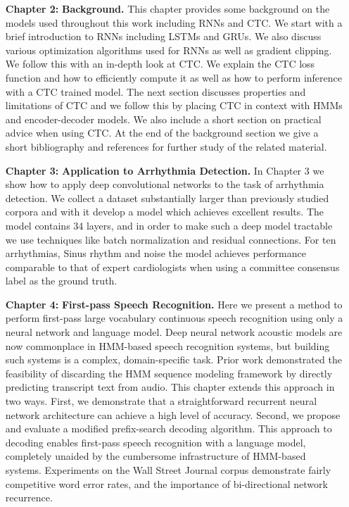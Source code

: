 \begin{itemize}
    \setlength{\itemindent}{3.4em}
    \item[{\bf Chapter 2:}]{\bf Background.} This chapter provides some
        background on the models used throughout this work including RNNs and
        CTC. We start with a brief introduction to RNNs including LSTMs and
        GRUs. We also discuss various optimization algorithms used for RNNs as
        well as gradient clipping. We follow this with an in-depth look at CTC.
        We explain the CTC loss function and how to efficiently compute it as
        well as how to perform inference with a CTC trained model. The next
        section discusses properties and limitations of CTC and we follow this
        by placing CTC in context with HMMs and encoder-decoder models. We also
        include a short section on practical advice when using CTC. At the end
        of the background section we give a short bibliography and references
        for further study of the related material. 

    \item [{\bf Chapter 3:}]{\bf Application to Arrhythmia Detection.} In
        Chapter 3 we show how to apply deep convolutional networks to the task
        of arrhythmia detection. We collect a dataset substantially larger than
        previously studied corpora and with it develop a model which achieves
        excellent results. The model contains 34 layers, and in order to make
        such a deep model tractable we use techniques like batch normalization
        and residual connections. For ten arrhythmias, Sinus rhythm and noise
        the model achieves performance comparable to that of expert
        cardiologists when using a committee consensus label as the ground
        truth.

    \item [{\bf Chapter 4:}]{\bf First-pass Speech Recognition.} Here we present
        a method to perform first-pass large vocabulary continuous speech
        recognition using only a neural network and language model. Deep neural
        network acoustic models are now commonplace in HMM-based speech
        recognition systems, but building such systems is a complex,
        domain-specific task. Prior work demonstrated the feasibility of
        discarding the HMM sequence modeling framework by directly predicting
        transcript text from audio. This chapter extends this approach in two
        ways. First, we demonstrate that a straightforward recurrent neural
        network architecture can achieve a high level of accuracy. Second, we
        propose and evaluate a modified prefix-search decoding algorithm. This
        approach to decoding enables first-pass speech recognition with a
        language model, completely unaided by the cumbersome infrastructure of
        HMM-based systems. Experiments on the Wall Street Journal corpus
        demonstrate fairly competitive word error rates, and the importance of
        bi-directional network recurrence. 


\end{itemize}
